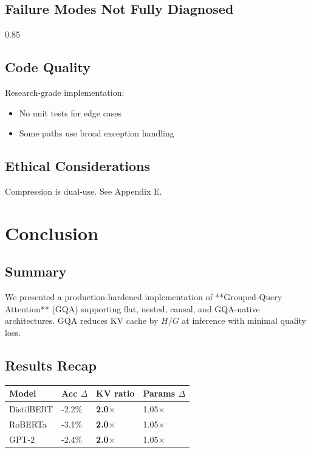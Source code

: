 \subsection{Failure Modes Not Fully Diagnosed}

0.85

\subsection{Code Quality}

Research-grade implementation:
\begin{itemize}
\item No unit tests for edge cases
\item Some paths use broad exception handling

\end{itemize}
\subsection{Ethical Considerations}

Compression is dual-use. See Appendix E.


\section{Conclusion}

\subsection{Summary}

We presented a production-hardened implementation of **Grouped-Query 
Attention** (GQA) supporting flat, nested, causal, and GQA-native 
architectures. GQA reduces KV cache by $H / G$ at inference with minimal 
quality loss.

\subsection{Results Recap}

\begin{table}[H]
\centering
\small
\begin{tabular}{llll}
\toprule
\textbf{Model} & \textbf{Acc $\Delta$} & \textbf{KV ratio} & \textbf{Params $\Delta$} \\
\midrule
DistilBERT & -2.2\% & \textbf{2.0$\times$} & 1.05$\times$ \\
RoBERTa & -3.1\% & \textbf{2.0$\times$} & 1.05$\times$ \\
GPT-2 & -2.4\% & \textbf{2.0$\times$} & 1.05$\times$ \\
\bottomrule
\end{tabular}
\end{table}

